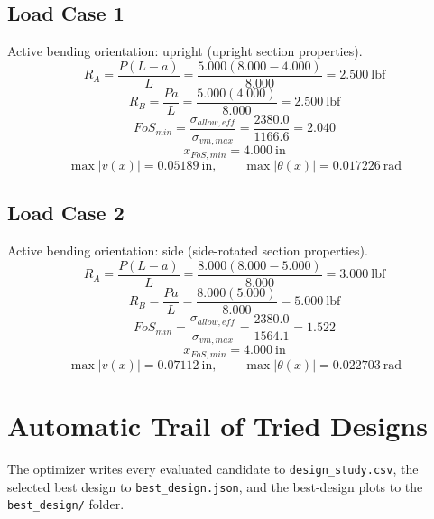 \documentclass[11pt]{article}
\begin{document}
\subsection*{Load Case 1}
Active bending orientation: upright (upright section properties).
\[R_A = \frac{P(L-a)}{L} = \frac{5.000(8.000-4.000)}{8.000} = 2.500\ \mathrm{lbf}\]
\[R_B = \frac{Pa}{L} = \frac{5.000(4.000)}{8.000} = 2.500\ \mathrm{lbf}\]
\[FoS_{min} = \frac{\sigma_{allow,eff}}{\sigma_{vm,max}} = \frac{2380.0}{1166.6} = 2.040\]
\[x_{FoS,min} = 4.000\ \mathrm{in}\]
\[\max |v(x)| = 0.05189\ \mathrm{in}, \qquad \max |\theta(x)| = 0.017226\ \mathrm{rad}\]
\subsection*{Load Case 2}
Active bending orientation: side (side-rotated section properties).
\[R_A = \frac{P(L-a)}{L} = \frac{8.000(8.000-5.000)}{8.000} = 3.000\ \mathrm{lbf}\]
\[R_B = \frac{Pa}{L} = \frac{8.000(5.000)}{8.000} = 5.000\ \mathrm{lbf}\]
\[FoS_{min} = \frac{\sigma_{allow,eff}}{\sigma_{vm,max}} = \frac{2380.0}{1564.1} = 1.522\]
\[x_{FoS,min} = 4.000\ \mathrm{in}\]
\[\max |v(x)| = 0.07112\ \mathrm{in}, \qquad \max |\theta(x)| = 0.022703\ \mathrm{rad}\]

\section*{Automatic Trail of Tried Designs}
The optimizer writes every evaluated candidate to \texttt{design\_study.csv}, the selected best design to \texttt{best\_design.json}, and the best-design plots to the \texttt{best\_design/} folder.
\end{document}
